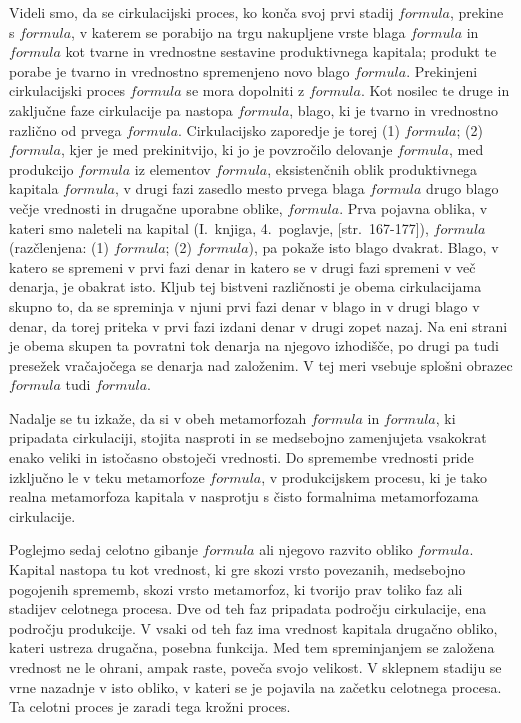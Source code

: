 \documentclass[kapital_02.tex]{subfiles}
\begin{document}
Videli smo, da se cirkulacijski proces, ko konča svoj prvi stadij \( formula \), prekine s \( formula \), v katerem se porabijo na trgu nakupljene vrste blaga \( formula \) in \( formula \) kot tvarne in vrednostne sestavine produktivnega kapitala; produkt te porabe je tvarno in vrednostno spremenjeno novo blago \( formula \). Prekinjeni cirkulacijski proces \( formula \) se mora dopolniti z \( formula \). Kot nosilec te druge in zaključne faze cirkulacije pa nastopa \( formula \), blago, ki je tvarno in vrednostno različno od prvega \( formula \). Cirkulacijsko zaporedje je torej (1) \( formula \); (2) \( formula \), kjer je med prekinitvijo, ki jo je povzročilo delovanje \( formula \), med produkcijo \( formula \) iz elementov \( formula \), eksistenčnih oblik produktivnega kapitala \( formula \), v drugi fazi zasedlo mesto prvega blaga \( formula \) drugo blago večje vrednosti in drugačne uporabne oblike, \( formula \). Prva pojavna oblika, v kateri smo naleteli na kapital (I.~knjiga, 4.~poglavje, [str.\ 167-177]), \( formula \) (razčlenjena: (1) \( formula \); (2) \( formula \)), pa pokaže isto blago dvakrat. Blago, v katero se spremeni v prvi fazi denar in katero se v drugi fazi spremeni v več denarja, je obakrat isto. Kljub tej bistveni različnosti je obema cirkulacijama skupno to, da se spreminja v njuni prvi fazi denar v blago in v drugi blago v denar, da torej priteka v prvi fazi izdani denar v drugi zopet nazaj. Na eni strani je obema skupen ta povratni tok denarja na njegovo izhodišče, po drugi pa tudi presežek vračajočega se denarja nad založenim. V tej meri vsebuje splošni obrazec \( formula \) tudi \( formula \).

Nadalje se tu izkaže, da si v obeh metamorfozah \( formula \) in \( formula \), ki pripadata cirkulaciji, stojita nasproti in se medsebojno zamenjujeta vsakokrat enako veliki in istočasno obstoječi vrednosti. Do spremembe vrednosti pride izključno le v teku metamorfoze \( formula \), v produkcijskem procesu, ki je tako realna metamorfoza kapitala v nasprotju s čisto formalnima metamorfozama cirkulacije.

Poglejmo sedaj celotno gibanje \( formula \) ali njegovo razvito obliko \( formula \). Kapital nastopa tu kot vrednost, ki gre skozi vrsto povezanih, medsebojno pogojenih sprememb, skozi vrsto metamorfoz, ki tvorijo prav toliko faz ali stadijev celotnega procesa. Dve od teh faz pripadata področju cirkulacije, ena področju produkcije. V vsaki od teh faz ima vrednost kapitala drugačno obliko, kateri ustreza drugačna, posebna funkcija. Med tem spreminjanjem se založena vrednost ne le ohrani, ampak raste, poveča svojo velikost. V sklepnem stadiju se vrne nazadnje v isto obliko, v kateri se je pojavila na začetku celotnega procesa. Ta celotni proces je zaradi tega krožni proces.
\end{document}
